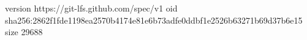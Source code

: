 version https://git-lfs.github.com/spec/v1
oid sha256:2862f1fde1198ea2570b4174e81e6b73adfe0ddbf1e2526b63271b69d37b6e15
size 29688
